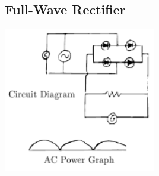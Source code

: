 \begin{multicols}{2}
\vfill
\columnbreak

\subsection{Full-Wave Rectifier}

\begin{center}
\includegraphics[width=0.5\textwidth]{./img/full-wave-rectifier-2.png}
\end{center}


\end{multicols}
